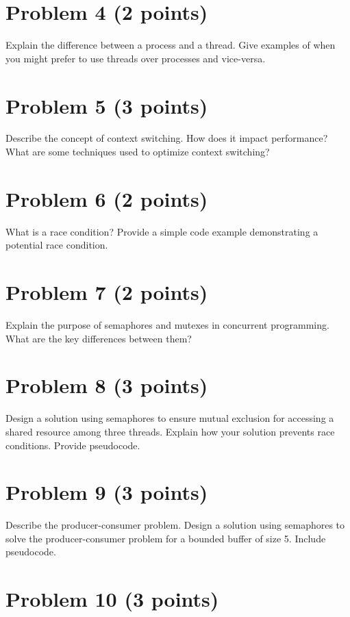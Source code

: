 \documentclass{article}
\begin{document}
\section*{Problem 4 (2 points)}

Explain the difference between a process and a thread.  Give examples of when you might prefer to use threads over processes and vice-versa.


\section*{Problem 5 (3 points)}

Describe the concept of context switching. How does it impact performance? What are some techniques used to optimize context switching?


\section*{Problem 6 (2 points)}

What is a race condition?  Provide a simple code example demonstrating a potential race condition.


\section*{Problem 7 (2 points)}

Explain the purpose of semaphores and mutexes in concurrent programming.  What are the key differences between them?


\section*{Problem 8 (3 points)}

Design a solution using semaphores to ensure mutual exclusion for accessing a shared resource among three threads. Explain how your solution prevents race conditions.  Provide pseudocode.


\section*{Problem 9 (3 points)}

Describe the producer-consumer problem. Design a solution using semaphores to solve the producer-consumer problem for a bounded buffer of size 5.  Include pseudocode.


\section*{Problem 10 (3 points)}
\end{document}
